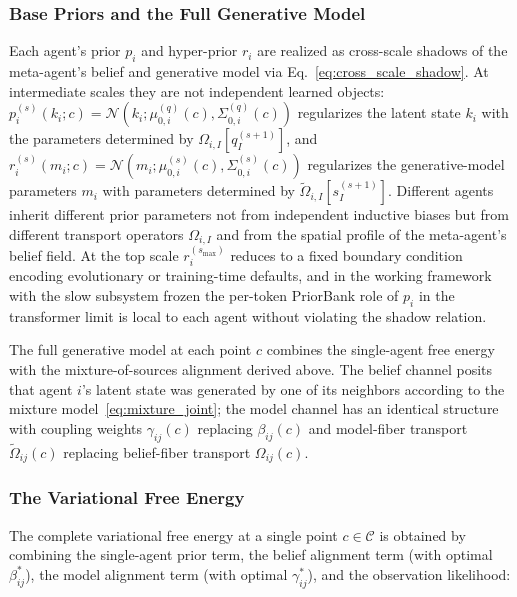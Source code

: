 \documentclass[11pt]{article}
\begin{document}
\subsubsection{Base Priors and the Full Generative Model}

Each agent's prior $p_i$ and hyper-prior $r_i$ are realized as cross-scale shadows of the meta-agent's belief and generative model via Eq.~\eqref{eq:cross_scale_shadow}. At intermediate scales they are not independent learned objects: $p_i^{(s)}(k_i; c) = \mathcal{N}(k_i; \mu_{0,i}^{(q)}(c), \Sigma_{0,i}^{(q)}(c))$ regularizes the latent state $k_i$ with the parameters determined by $\Omega_{i,I}[q_I^{(s+1)}]$, and $r_i^{(s)}(m_i; c) = \mathcal{N}(m_i; \mu_{0,i}^{(s)}(c), \Sigma_{0,i}^{(s)}(c))$ regularizes the generative-model parameters $m_i$ with parameters determined by $\tilde\Omega_{i,I}[s_I^{(s+1)}]$. Different agents inherit different prior parameters not from independent inductive biases but from different transport operators $\Omega_{i,I}$ and from the spatial profile of the meta-agent's belief field. At the top scale $r_i^{(s_{\max})}$ reduces to a fixed boundary condition encoding evolutionary or training-time defaults, and in the working framework with the slow subsystem frozen the per-token PriorBank role of $p_i$ in the transformer limit is local to each agent without violating the shadow relation.

The full generative model at each point $c$ combines the single-agent free energy~\cite{Friston2010, parr2022active} with the mixture-of-sources alignment derived above. The belief channel posits that agent $i$'s latent state was generated by one of its neighbors according to the mixture model~\eqref{eq:mixture_joint}; the model channel has an identical structure with coupling weights $\gamma_{ij}(c)$ replacing $\beta_{ij}(c)$ and model-fiber transport $\tilde{\Omega}_{ij}(c)$ replacing belief-fiber transport $\Omega_{ij}(c)$.

\subsubsection{The Variational Free Energy}

The complete variational free energy at a single point $c \in \mathcal{C}$ is obtained by combining the single-agent prior term, the belief alignment term (with optimal $\beta^*_{ij}$), the model alignment term (with optimal $\gamma^*_{ij}$), and the observation likelihood:
\end{document}

